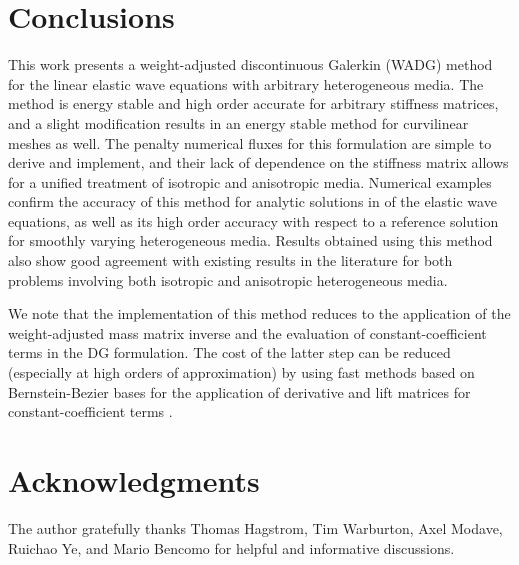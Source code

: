 \documentclass{siamart0216}
\newcommand{\pd}[2]{\frac{\partial#1}{\partial#2}}
\begin{document}
\section{Conclusions}
\label{sec:conclusions}

This work presents a weight-adjusted discontinuous Galerkin (WADG) method for the linear elastic wave equations with arbitrary heterogeneous media.  The method is energy stable and high order accurate for arbitrary stiffness matrices, and a slight modification results in an energy stable method for curvilinear meshes as well.  The penalty numerical fluxes for this formulation are simple to derive and implement, and their lack of dependence on the stiffness matrix allows for a unified treatment of isotropic and anisotropic media.  Numerical examples confirm the accuracy of this method for analytic solutions in of the elastic wave equations, as well as its high order accuracy with respect to a reference solution for smoothly varying heterogeneous media.  Results obtained using this method also show good agreement with existing results in the literature for both problems involving both isotropic and anisotropic heterogeneous media.  

We note that the implementation of this method reduces to the application of the weight-adjusted mass matrix inverse and the evaluation of constant-coefficient terms in the DG formulation.  The cost of the latter step can be reduced (especially at high orders of approximation) by using fast methods based on Bernstein-Bezier bases for the application of derivative and lift matrices for constant-coefficient terms \cite{chan2015bbdg}.  %


\section{Acknowledgments}

The author gratefully thanks Thomas Hagstrom, Tim Warburton, Axel Modave, Ruichao Ye, and Mario Bencomo for helpful and informative discussions.  



\end{document}
